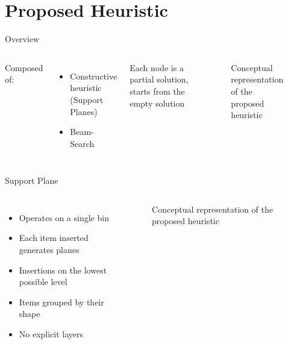 \documentclass{beamer}
\begin{document}
    \section{Proposed Heuristic}
    \begin{frame}{Overview}
        \begin{columns}[onlytextwidth,T]
        \column{\dimexpr\linewidth-75mm-5mm}
        Composed of:
        \begin{itemize}
            \item Constructive heuristic (Support Planes)
            \item Beam-Search
        \end{itemize}
        Each node is a partial solution, starts from the empty solution
        \column{75mm}
            \begin{figure}[h]
                \resizebox*{!}{.6\textheight}{%
                
                }
                \caption{Conceptual representation of the proposed heuristic}
                \label{fig:heur_scheme}
            \end{figure}
        \end{columns}
    \end{frame}
    \begin{frame}{Support Plane}
        \begin{columns}[onlytextwidth,T]
            \column{\dimexpr\linewidth-65mm-5mm}
            \begin{itemize}
                \item Operates on a single bin
                \item Each item inserted generates planes
                \item Insertions on the lowest possible level
                \item Items grouped by their shape
                \item No explicit layers
            \end{itemize}
            \column{65mm}
                \begin{figure}[h]
                    \resizebox*{\columnwidth}{!}{%
                    
                    }
                    \caption{Conceptual representation of the proposed heuristic}
                    \label{fig:heur_scheme}
                \end{figure}
            \end{columns}
    \end{frame}
\end{document}
